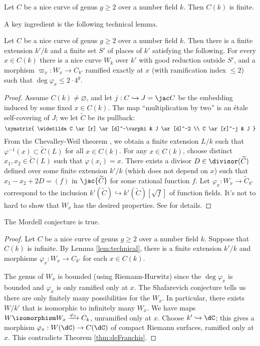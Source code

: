 \begin{conjecture}[Mordell]
Let $C$ be a nice curve of genus $g\geqslant 2$ over a number field $k$. Then 
$C(k)$ is finite. 
\end{conjecture}

A key ingredient is the following technical lemma. 

\begin{lemma}\label{lem:technical}
Let $C$ be a nice curve of genus $g\geqslant 2$ over a number field $k$. Then 
there is a finite extension $k'/k$ and a finite set $S'$ of places of $k'$ 
satisfying the following. For every $x\in C(k)$ there is a nice curve $W_k$ 
over $k'$ with good reduction outside $S'$, and a morphism 
$\varpi_x:W_x \to C_{k'}$ ramified exactly at $x$ (with ramification index 
$\leqslant 2$) such that $\deg\varphi_x \leqslant 2\cdot 4^g$. 
\end{lemma}
\begin{proof}
Assume $C(k)\ne\varnothing$, and let $j:C\hookrightarrow J=\jac C$ be the 
embedding induced by some fixed $x\in C(k)$. The map ``multiplication by two'' 
is an \'etale self-covering of $J$; we let $\widetilde C$ be its pullback: 
\[\xymatrix{
  \widetilde C \ar[r] \ar[d]^-\varphi 
    & J \ar[d]^-2 \\
  C \ar[r]^-j 
    & J 
}\]
From the Chevalley-Weil theorem \cite[10.3.11]{bg06}, we obtain a finite 
extension $L/k$ such that $\varphi^{-1}(x)\subset \widetilde C(L)$ for all 
$x\in C(k)$. For any $x\in C(k)$, choose distinct $x_1,x_2\in \widetilde C(L)$ 
such that $\varphi(x_i) = x$. There exists a divisor 
$D\in \divisor(\widetilde C)$ defined over some finite extension $k'/k$ (which 
does not depend on $x$) such that $x_1-x_2 + 2 D=(f)$ in $\jac{\widetilde C}$ 
for some rational function $f$. Let 
$\varphi_x:W_x \to \widetilde C_{k'}$ correspond to the inclusion 
$k'(\widetilde C)\hookrightarrow k'(\widetilde C)[\sqrt f]$ of function 
fields. It's not to hard to show that $W_x$ has the desired properties. See 
\cite[IV.2.1]{la91} for details. 
\end{proof}

\begin{theorem}
The Mordell conjecture is true. 
\end{theorem}
\begin{proof}
Let $C$ be a nice curve of genus $g\geqslant 2$ over a number field $k$. 
Suppose that $C(k)$ is infinite. By Lemma \ref{lem:technical}, there is a 
finite extension $k'/k$ and morphisms $\varphi_x:W_x \to C_{k'}$ for each 
$x\in C(k)$. 

The genus of $W_x$ is bounded (using Riemann-Hurwitz) since the 
$\deg\varphi_x$ is bounded and $\varphi_x$ is only ramified only at $x$. 
The Shafarevich conjecture tells us there are only finitely many possibilities 
for the $W_x$. In particular, there exists $W/k'$ that is isomorphic to 
infinitely many $W_x$. We have maps 
$W\isomorphism W_x \xrightarrow{\varphi_x} C_k$, unramified only at $x$. 
Choose $k'\hookrightarrow\dC$; this gives a morphism 
$\varphi_x:W(\dC) \to C(\dC)$ of compact Riemann surfaces, ramified only at 
$x$. This contradicts Theorem \ref{thm:deFranchis}.
\end{proof}

